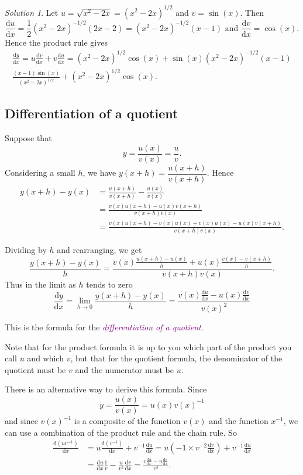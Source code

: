\documentclass[
  english,
  11pt,
  oneside]{book}
\newcommand{\slide}{}
\theoremstyle{definition}
\theoremstyle{definition}
\theoremstyle{definition}
\theoremstyle{definition}
\theoremstyle{remark}
\newtheorem*{solution}{Solution}
\begin{document}
\begin{solution}
Let \(u = \sqrt{x^2-2x} = (x^2-2x)^{1/2}\) and \(v = \sin(x)\). Then
\[\frac{\mathrm{d} u}{\mathrm{d} x} = \frac12(x^2-2x)^{-1/2}(2x-2)=(x^2-2x)^{-1/2}(x-1)\text{ and }\frac{\mathrm{d} v}{\mathrm{d} x} = \cos(x).\]
Hence the product rule gives
\begin{gather*}
\frac{\mathrm{d} y}{\mathrm{d} x} = u\frac{\mathrm{d} v}{\mathrm{d} x} + v\frac{\mathrm{d} u}{\mathrm{d} x} = (x^2-2x)^{1/2}\cos(x) + \sin(x)(x^2-2x)^{-1/2}(x-1)\\
\frac{(x-1)\sin(x)}{(x^2-2x)^{1/2}} + (x^2-2x)^{1/2}\cos(x).
\end{gather*}
\end{solution}

\slide

\subsection{Differentiation of a quotient}\label{differentiation-of-a-quotient}

Suppose that
\[y = \frac{u(x)}{v(x)} = \frac{u}{v}.\]
Considering a small \(h\), we have \(y(x+h) = \dfrac{u(x+h)}{v(x+h)}\).
Hence
\begin{align*}
y(x+h)-y(x) &= \frac{u(x+h)}{v(x+h)} - \frac{u(x)}{v(x)}\\
&=\frac{v(x)u(x+h)-u(x)v(x+h)}{v(x+h)v(x)}\\
&=\tfrac{v(x)u(x+h)-v(x)u(x)+v(x)u(x)-u(x)v(x+h)}{v(x+h)v(x)}.
\end{align*}
\slide
Dividing by \(h\) and rearranging, we get
\[\frac{y(x+h)-y(x)}{h} = \frac{v(x)\frac{u(x+h)-u(x)}{h}+u(x)\frac{v(x)-v(x+h)}{h}}{v(x+h)v(x)}.\]
Thus in the limit as \(h\) tends to zero
\[\frac{\mathrm{d} y}{\mathrm{d} x} = \lim\limits_{h\to0}\frac{y(x+h)-y(x)}{h} = \frac{v(x)\frac{\mathrm{d} u}{\mathrm{d} x} - u(x)\frac{\mathrm{d} v}{\mathrm{d} x}}{v(x)^2}\]

This is the formula for the \textcolor{purple}{\em differentiation of a quotient}.

Note that for the product formula it is up to you which part of the product you call \(u\) and which \(v\), but that for the quotient formula, the denominator of the quotient must be \(v\) and the numerator must be \(u\).
\slide

There is an alternative way to derive this formula. Since
\[y = \frac{u(x)}{v(x)} = u(x)v(x)^{-1}\]
and since \(v(x)^{-1}\) is a composite of the function \(v(x)\) and the function \(x^{-1}\), we can use a combination of the product rule and the chain rule. So
\begin{align*}
\frac{\mathrm{d}(uv^{-1})}{\mathrm{d} x} &= u\frac{\mathrm{d}(v^{-1})}{\mathrm{d} x}+v^{-1}\frac{\mathrm{d} u}{\mathrm{d} x} = u\left(-1\times v^{-2}\frac{\mathrm{d} v}{\mathrm{d} x}\right) + v^{-1}\frac{\mathrm{d} u}{\mathrm{d} x}\\
&= \frac{\mathrm{d} u}{\mathrm{d} x}\frac{1}{v} - \frac{u}{v^2}\frac{\mathrm{d} v}{\mathrm{d} x} = \frac{v\frac{\mathrm{d} u}{\mathrm{d} x}-u\frac{\mathrm{d} v}{\mathrm{d} x}}{v^2}.
\end{align*}
\slide
\end{document}
